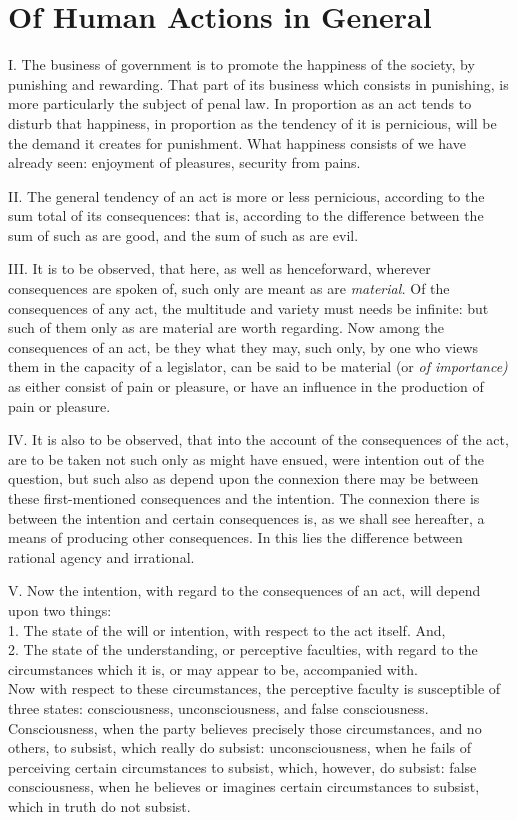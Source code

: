 \documentclass[12pt]{report}
\begin{document}
\chapter{Of Human Actions in General}

I. The business of government is to promote the happiness of the
society, by punishing and rewarding. That part of its business which
consists in punishing, is more particularly the subject of penal law. In
proportion as an act tends to disturb that happiness, in proportion as
the tendency of it is pernicious, will be the demand it creates for
punishment. What happiness consists of we have already seen: enjoyment
of pleasures, security from pains.

II. The general tendency of an act is more or less pernicious, according
to the sum total of its consequences: that is, according to the
difference between the sum of such as are good, and the sum of such as
are evil.

III. It is to be observed, that here, as well as henceforward, wherever
consequences are spoken of, such only are meant as are \emph{material.}
Of the consequences of any act, the multitude and variety must needs be
infinite: but such of them only as are material are worth regarding. Now
among the consequences of an act, be they what they may, such only, by
one who views them in the capacity of a legislator, can be said to be
material (or \emph{of importance)} as either consist of pain or
pleasure, or have an influence in the production of pain or pleasure.

IV. It is also to be observed, that into the account of the consequences
of the act, are to be taken not such only as might have ensued, were
intention out of the question, but such also as depend upon the
connexion there may be between these first-mentioned consequences and
the intention. The connexion there is between the intention and certain
consequences is, as we shall see hereafter, a means of producing other
consequences. In this lies the difference between rational agency and
irrational.

V. Now the intention, with regard to the consequences of an act, will
depend upon two things:\\
1. The state of the will or intention, with respect to the act itself.
And,\\
2. The state of the understanding, or perceptive faculties, with regard
to the circumstances which it is, or may appear to be, accompanied
with.\\
Now with respect to these circumstances, the perceptive faculty is
susceptible of three states: consciousness, unconsciousness, and false
consciousness. Consciousness, when the party believes precisely those
circumstances, and no others, to subsist, which really do subsist:
unconsciousness, when he fails of perceiving certain circumstances to
subsist, which, however, do subsist: false consciousness, when he
believes or imagines certain circumstances to subsist, which in truth do
not subsist.
\end{document}
